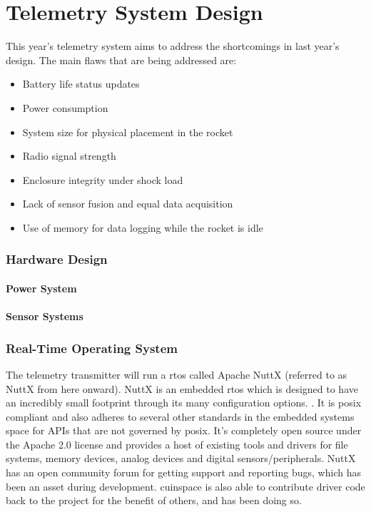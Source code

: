 \part{Telemetry System Design}

This year's telemetry system aims to address the shortcomings in last year's design. The main flaws that are being
addressed are:

\begin{itemize}
    \item Battery life status updates
    \item Power consumption
    \item System size for physical placement in the rocket
    \item Radio signal strength
    \item Enclosure integrity under shock load
    \item Lack of sensor fusion and equal data acquisition
    \item Use of memory for data logging while the rocket is idle
\end{itemize}

\section{Hardware Design}

\subsection{Power System}


\subsection{Sensor Systems}


\section{Real-Time Operating System}

The telemetry transmitter will run a \gls{rtos} called Apache NuttX (referred to as NuttX from here onward). NuttX is
an embedded \gls{rtos} which is designed to have an incredibly small footprint through its many configuration options.
\cite{nuttx-about}. It is \gls{posix} compliant and also adheres to several other standards in the embedded systems
space for APIs that are not governed by \gls{posix}. \cite{nuttx-about} It's completely open source under the Apache
2.0 license and provides a host of existing tools and drivers for file systems, memory devices, analog devices and
digital sensors/peripherals. NuttX has an open community forum for getting support and reporting bugs, which has been
an asset during development. \Gls{cuinspace} is also able to contribute driver code back to the project for the benefit
of others, and has been doing so.

